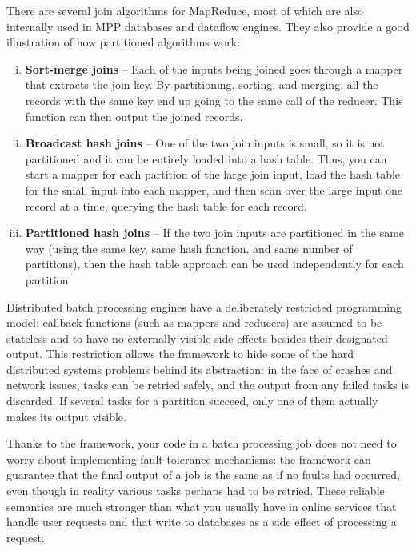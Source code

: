 \documentclass{article}
\begin{document}
    There are several join algorithms for MapReduce, most of which are also internally used in MPP databases and dataflow engines. They also provide a good illustration of how partitioned algorithms work:
    
    \begin{enumerate}[i.]
        \item \textbf{Sort-merge joins} -- Each of the inputs being joined goes through a mapper that extracts the join key. By partitioning, sorting, and merging, all the records with the same key end up going to the same call of the reducer. This function can then output the joined records.
        
        \item \textbf{Broadcast hash joins} -- One of the two join inputs is small, so it is not partitioned and it can be entirely loaded into a hash table. Thus, you can start a mapper for each partition of the large join input, load the hash table for the small input into each mapper, and then scan over the large input one record at a time, querying the hash table for each record.
        
        \item \textbf{Partitioned hash joins} -- If the two join inputs are partitioned in the same way (using the same key, same hash function, and same number of partitions), then the hash table approach can be used independently for each partition.
    \end{enumerate}
    
    Distributed batch processing engines have a deliberately restricted programming model: callback functions (such as mappers and reducers) are assumed to be stateless and to have no externally visible side effects besides their designated output. This restriction allows the framework to hide some of the hard distributed systems problems behind its abstraction: in the face of crashes and network issues, tasks can be retried safely, and the output from any failed tasks is discarded. If several tasks for a partition succeed, only one of them actually makes its output visible.
    
    Thanks to the framework, your code in a batch processing job does not need to worry about implementing fault-tolerance mechanisms: the framework can guarantee that the final output of a job is the same as if no faults had occurred, even though in reality various tasks perhaps had to be retried. These reliable semantics are much stronger than what you usually have in online services that handle user requests and that write to databases as a side effect of processing a request.
    
\end{document}
